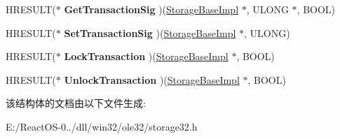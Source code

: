 \begin{DoxyCompactItemize}
H\+R\+E\+S\+U\+LT($\ast$ {\bfseries Get\+Transaction\+Sig} )(\hyperlink{struct_storage_base_impl}{Storage\+Base\+Impl} $\ast$, U\+L\+O\+NG $\ast$, B\+O\+OL)
\item 
\mbox{\label{struct_storage_base_impl_vtbl_a8e42e6aef8ae432a8391540e68116bd4}} 
H\+R\+E\+S\+U\+LT($\ast$ {\bfseries Set\+Transaction\+Sig} )(\hyperlink{struct_storage_base_impl}{Storage\+Base\+Impl} $\ast$, U\+L\+O\+NG)
\item 
\mbox{\label{struct_storage_base_impl_vtbl_afd34bd41d849c57f20d59af55bfc7f84}} 
H\+R\+E\+S\+U\+LT($\ast$ {\bfseries Lock\+Transaction} )(\hyperlink{struct_storage_base_impl}{Storage\+Base\+Impl} $\ast$, B\+O\+OL)
\item 
\mbox{\label{struct_storage_base_impl_vtbl_a6b82d7276ac50f64e3d692f04510b6ca}} 
H\+R\+E\+S\+U\+LT($\ast$ {\bfseries Unlock\+Transaction} )(\hyperlink{struct_storage_base_impl}{Storage\+Base\+Impl} $\ast$, B\+O\+OL)
\end{DoxyCompactItemize}


该结构体的文档由以下文件生成\+:\begin{DoxyCompactItemize}
\item 
E\+:/\+React\+O\+S-\/0../dll/win32/ole32/storage32.\+h\end{DoxyCompactItemize}
